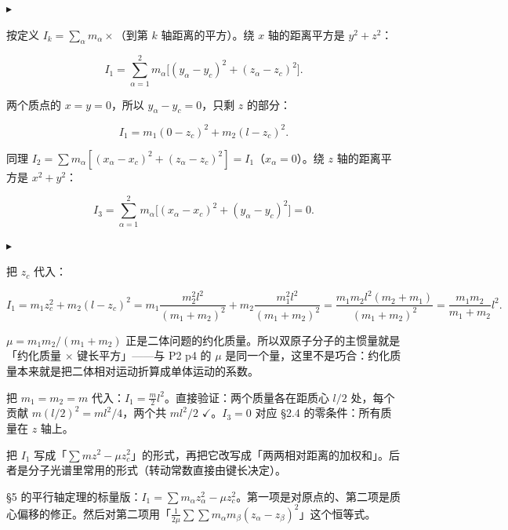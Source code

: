\documentclass[11pt]{ctexart}
\renewcommand{\qbreak}{\needspace{0.30\textheight}}
\newcommand{\step}[1]{\par\vspace{3pt}\noindent
  {\color{violet}\small$\blacktriangleright$}\hspace{3pt}{\bfseries\color{violetdeep}#1}\par\vspace{1pt}}
\begin{document}
\step{第二步：三个轴惯量}
按定义 $I_k=\sum_\alpha m_\alpha\times$（到第 $k$ 轴距离的平方）。绕 $x$ 轴的距离平方是 $y^2+z^2$：

\[
I_1=\sum_{\alpha=1}^{2}m_\alpha\bigl[(y_\alpha-y_c)^2+(z_\alpha-z_c)^2\bigr].
\]

两个质点的 $x=y=0$，所以 $y_\alpha-y_c=0$，只剩 $z$ 的部分：

\[
I_1=m_1(0-z_c)^2+m_2(l-z_c)^2 .
\]

同理 $I_2=\sum m_\alpha[(x_\alpha-x_c)^2+(z_\alpha-z_c)^2]=I_1$（$x_\alpha=0$）。绕 $z$ 轴的距离平方是 $x^2+y^2$：

\[
I_3=\sum_{\alpha=1}^{2}m_\alpha\bigl[(x_\alpha-x_c)^2+(y_\alpha-y_c)^2\bigr]=0 .
\]


\step{第三步：化简 $I_1$}
把 $z_c$ 代入：

\[
I_1=m_1z_c^2+m_2(l-z_c)^2
=m_1\frac{m_2^2l^2}{(m_1+m_2)^2}+m_2\frac{m_1^2l^2}{(m_1+m_2)^2}
=\frac{m_1m_2l^2(m_2+m_1)}{(m_1+m_2)^2}
=\frac{m_1m_2}{m_1+m_2}l^2 .
\]


$\mu=m_1m_2/(m_1+m_2)$ 正是二体问题的约化质量。所以双原子分子的主惯量就是「约化质量 $\times$ 键长平方」——与 P2 p4 的 $\mu$ 是同一个量，这里不是巧合：约化质量本来就是把二体相对运动折算成单体运动的系数。

把 $m_1=m_2=m$ 代入：$I_1=\frac{m}{2}l^2$。直接验证：两个质量各在距质心 $l/2$ 处，每个贡献 $m(l/2)^2=ml^2/4$，两个共 $ml^2/2$ $\checkmark$。$I_3=0$ 对应 \S2.4 的零条件：所有质量在 $z$ 轴上。

\qbreak
{}

\qbreak
{}

把 $I_1$ 写成「$\sum mz^2-\mu z_c^2$」的形式，再把它改写成「两两相对距离的加权和」。后者是分子光谱里常用的形式（转动常数直接由键长决定）。

\S5 的平行轴定理的标量版：$I_1=\sum m_\alpha z_\alpha^2-\mu z_c^2$。第一项是对原点的、第二项是质心偏移的修正。然后对第二项用「$\frac{1}{2\mu}\sum\sum m_\alpha m_\beta(z_\alpha-z_\beta)^2$」这个恒等式。
\end{document}
